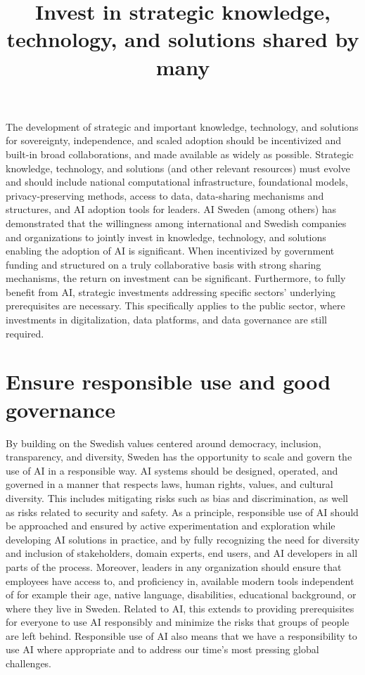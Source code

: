 \title{
Invest in strategic knowledge, technology, and solutions shared by many
}
The development of strategic and important knowledge, technology, and solutions for sovereignty, independence, and scaled adoption should be incentivized and built-in broad collaborations, and made available as widely as possible. Strategic knowledge, technology, and solutions (and other relevant resources) must evolve and should include national computational infrastructure, foundational models, privacy-preserving methods, access to data, data-sharing mechanisms and structures, and AI adoption tools for leaders.
AI Sweden (among others) has demonstrated that the willingness among international and Swedish companies and organizations to jointly invest in knowledge, technology, and solutions enabling the adoption of AI is significant. When incentivized by government funding and structured on a truly collaborative basis with strong sharing mechanisms, the return on investment can be significant.
Furthermore, to fully benefit from AI, strategic investments addressing specific sectors' underlying prerequisites are necessary. This specifically applies to the public sector, where investments in digitalization, data platforms, and data governance are still required.
\section*{Ensure responsible use and good governance}
By building on the Swedish values centered around democracy, inclusion, transparency, and diversity, Sweden has the opportunity to scale and govern the use of AI in a responsible way. AI systems should be designed, operated, and governed in a manner that respects laws, human rights, values, and cultural diversity. This includes mitigating risks such as bias and discrimination, as well as risks related to security and safety.
As a principle, responsible use of AI should be approached and ensured by active experimentation and exploration while developing AI solutions in practice, and by fully recognizing the need for diversity and inclusion of stakeholders, domain experts, end users, and AI developers in all parts of the process.
Moreover, leaders in any organization should ensure that employees have access to, and proficiency in, available modern tools independent of for example their age, native language, disabilities, educational background, or where they live in Sweden. Related to AI, this extends to providing prerequisites for everyone to use AI responsibly and minimize the risks that groups of people are left behind.
Responsible use of AI also means that we have a responsibility to use AI where appropriate and to address our time's most pressing global challenges.

